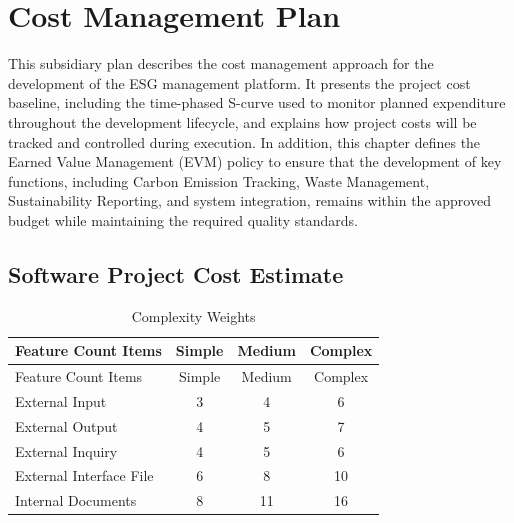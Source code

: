 \documentclass[12pt,a4paper]{article}
\begin{document}


\clearpage
\section{Cost Management Plan}
This subsidiary plan describes the cost management approach for the development of the  ESG management platform. It presents the project cost baseline, including the time-phased S-curve used to monitor planned expenditure throughout the development lifecycle, and explains how project costs will be tracked and controlled during execution. In addition, this chapter defines the Earned Value Management (EVM) policy to ensure that the development of key functions, including Carbon Emission Tracking, Waste Management, Sustainability Reporting, and system integration, remains within the approved budget while maintaining the required quality standards.


\subsection{Software Project Cost Estimate}

\begin{longtable}{lccc}
\caption{Complexity Weights}\label{tab:complexity_weights}\\
\toprule
Feature Count Items & Simple & Medium & Complex \\
\midrule
\endfirsthead
\toprule
Feature Count Items & Simple & Medium & Complex \\
\midrule
\endhead
External Input          & 3 &  4 &  6 \\
External Output         & 4 &  5 &  7 \\
External Inquiry        & 4 &  5 &  6 \\
External Interface File & 6 &  8 & 10 \\
Internal Documents      & 8 & 11 & 16 \\
\bottomrule
\end{longtable}
\end{document}
